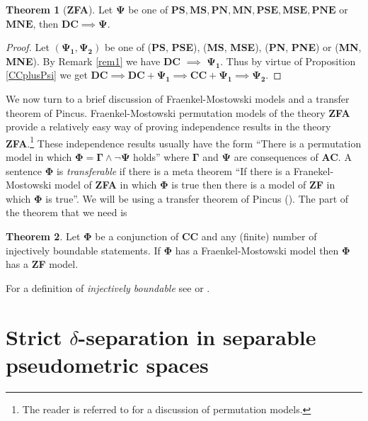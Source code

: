 \documentclass[11pt, reqno]{amsart}
\theoremstyle{definition}
\newtheorem{theorem}{Theorem}
\numberwithin{theorem}{section}
\theoremstyle{definition}
\theoremstyle{definition}
\theoremstyle{definition}
\theoremstyle{definition}
\theoremstyle{definition}
\numberwithin{claim}{section}
\theoremstyle{definition}
\theoremstyle{definition}
\theoremstyle{definition}
\theoremstyle{definition}
\theoremstyle{definition}
\theoremstyle{remboldstyle}
\begin{document}
\label{S:DCtoAll}
\begin{theorem}[\textbf{ZFA}]
\label{T:DCImpliesEverything}
Let $\mathbf{\Psi}$ be one of $ \mathbf{PS, MS, PN, MN, PSE, MSE, PNE}$ or $\mathbf{MNE}$, then $\mathbf{DC} \implies \mathbf{\Psi}$.
\end{theorem}
\begin{proof}
Let $(\mathbf{\Psi_1}, \mathbf{\Psi_2})$ be one of (\textbf{PS}, \textbf{PSE}), (\textbf{MS}, \textbf{MSE}), (\textbf{PN}, \textbf{PNE}) or (\textbf{MN}, \textbf{MNE}). By Remark \ref{rem1} we have \textbf{DC} $\implies$ $\mathbf{\Psi_1}$. Thus by virtue of Proposition \ref{CCplusPsi} we get $\textbf{DC} \implies \textbf{DC} + \mathbf{\Psi_1} \implies \textbf{CC} + \mathbf{\Psi_1} \implies \mathbf{\Psi_2}$.
\end{proof}
\par  
  We now turn to a brief discussion of Fraenkel-Mostowski models and a transfer theorem of Pincus.  Fraenkel-Mostowski permutation models of the theory \textbf{ZFA} provide a relatively easy way of proving independence results in the theory \textbf{ZFA}.\footnote{The reader is referred to \cite[Chapter 4]{Jech} for a discussion of permutation models.}  
  These independence results usually have the form ``There is a permutation model in which $\mathbf{\Phi} = \mathbf{\Gamma} \land \lnot \mathbf{\Psi}$ holds'' where $\mathbf{\Gamma}$ and $\mathbf{\Psi}$ are consequences of \textbf{AC}.  A sentence $\mathbf{\Phi}$ is \emph{transferable} if there is a meta theorem  ``If there is a Franekel-Mostowski model of \textbf{ZFA} in which $\mathbf{\Phi}$ is true then there is a model of \textbf{ZF} in which $\mathbf{\Phi}$ is true''.  We will be using a transfer theorem of Pincus (\cite[Theorem 4]{Pincus}).  The part of the theorem that we need is
  \begin{theorem} \label{T:Pincus}
  Let $\mathbf{\Phi}$ be a conjunction of $\mathbf{CC}$ and any (finite) number of injectively boundable statements. If $\mathbf{\Phi}$ has a Fraenkel-Mostowski model then $\mathbf{\Phi}$ has a \textbf{ZF} model.  
  \end{theorem}
  For a definition of \emph{injectively boundable} see \cite{Pincus} or \cite[Note 103]{HR}.

\section{Strict $\delta$-separation in separable pseudometric spaces} \label{S:sepPsmSpaces}
\end{document}
